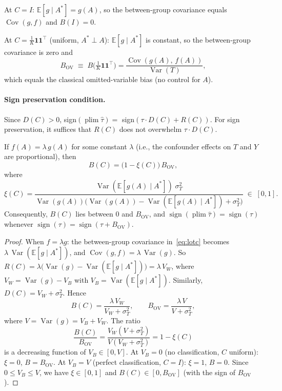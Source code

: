 At $C=I$: $\mathbb{E}[g\mid A^*]=g(A)$, so the between-group covariance equals $\operatorname{Cov}(g,f)$ and $B(I)=0$.

At $C=\frac{1}{K}\mathbf{1}\mathbf{1}^\top$ (uniform, $A^*\perp A$): $\mathbb{E}[g\mid A^*]$ is constant, so the between-group covariance is zero and
\begin{equation}
  B_{\mathrm{OV}} \;\equiv\; B\bigl(\tfrac{1}{K}\mathbf{1}\mathbf{1}^\top\bigr)
  = \frac{\operatorname{Cov}(g(A),\,f(A))}{\operatorname{Var}(T)},
  \label{eq:bov}
\end{equation}
which equals the classical omitted-variable bias (no control for $A$).

\paragraph{Sign preservation condition.}
Since $D(C)>0$, sign$(\operatorname{plim}\hat\tau) = $ sign$(\tau\cdot D(C) + R(C))$.
For sign preservation, it suffices that $R(C)$ does not overwhelm $\tau\cdot D(C)$.

\begin{proposition}
\label{prop:conf_prop}
If $f(A) = \lambda\,g(A)$ for some constant $\lambda$ (i.e., the confounder effects on $T$ and $Y$ are proportional), then
\begin{equation}
  B(C) = \bigl(1-\xi(C)\bigr)\,B_{\mathrm{OV}},
  \label{eq:convex}
\end{equation}
where
\[
  \xi(C) = \frac{\operatorname{Var}(\mathbb{E}[g(A)\mid A^*])\;\sigma_T^2}
  {\operatorname{Var}(g(A))\bigl(\operatorname{Var}(g(A))-\operatorname{Var}(\mathbb{E}[g(A)\mid A^*])+\sigma_T^2\bigr)}
  \;\in\;[0,1].
\]
Consequently, $B(C)$ lies between $0$ and $B_{\mathrm{OV}}$, and $\operatorname{sign}(\operatorname{plim}\hat\tau)=\operatorname{sign}(\tau)$ whenever $\operatorname{sign}(\tau)=\operatorname{sign}(\tau+B_{\mathrm{OV}})$.
\end{proposition}

\begin{proof}
When $f=\lambda g$: the between-group covariance in~\eqref{eq:lotc} becomes $\lambda\,\operatorname{Var}(\mathbb{E}[g\mid A^*])$, and $\operatorname{Cov}(g,f)=\lambda\,\operatorname{Var}(g)$.
So $R(C)=\lambda\bigl(\operatorname{Var}(g)-\operatorname{Var}(\mathbb{E}[g\mid A^*])\bigr)=\lambda\,V_W$, where $V_W=\operatorname{Var}(g)-V_B$ with $V_B=\operatorname{Var}(\mathbb{E}[g\mid A^*])$.
Similarly, $D(C)=V_W+\sigma_T^2$.
Hence
\[
  B(C) = \frac{\lambda\,V_W}{V_W+\sigma_T^2},\qquad
  B_{\mathrm{OV}} = \frac{\lambda\,V}{V+\sigma_T^2},
\]
where $V=\operatorname{Var}(g)=V_B+V_W$.
The ratio
\[
  \frac{B(C)}{B_{\mathrm{OV}}} = \frac{V_W(V+\sigma_T^2)}{V(V_W+\sigma_T^2)} = 1 - \xi(C)
\]
is a decreasing function of $V_B\in[0,V]$.
At $V_B=0$ (no classification, $C$ uniform): $\xi=0$, $B=B_{\mathrm{OV}}$.
At $V_B=V$ (perfect classification, $C=I$): $\xi=1$, $B=0$.
Since $0\leq V_B\leq V$, we have $\xi\in[0,1]$ and $B(C)\in[0,B_{\mathrm{OV}}]$ (with the sign of $B_{\mathrm{OV}}$).
\end{proof}

